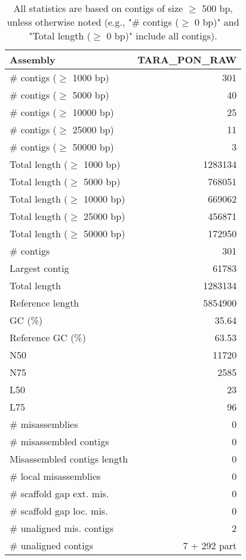 \documentclass[12pt,a4paper]{article}
\begin{document}
\begin{table}[ht]
\begin{center}
\caption{All statistics are based on contigs of size $\geq$ 500 bp, unless otherwise noted (e.g., "\# contigs ($\geq$ 0 bp)" and "Total length ($\geq$ 0 bp)" include all contigs).}
\begin{tabular}{|l*{1}{|r}|}
\hline
Assembly & TARA\_PON\_RAW \\ \hline
\# contigs ($\geq$ 1000 bp) & 301 \\ \hline
\# contigs ($\geq$ 5000 bp) & 40 \\ \hline
\# contigs ($\geq$ 10000 bp) & 25 \\ \hline
\# contigs ($\geq$ 25000 bp) & 11 \\ \hline
\# contigs ($\geq$ 50000 bp) & 3 \\ \hline
Total length ($\geq$ 1000 bp) & 1283134 \\ \hline
Total length ($\geq$ 5000 bp) & 768051 \\ \hline
Total length ($\geq$ 10000 bp) & 669062 \\ \hline
Total length ($\geq$ 25000 bp) & 456871 \\ \hline
Total length ($\geq$ 50000 bp) & 172950 \\ \hline
\# contigs & 301 \\ \hline
Largest contig & 61783 \\ \hline
Total length & 1283134 \\ \hline
Reference length & 5854900 \\ \hline
GC (\%) & 35.64 \\ \hline
Reference GC (\%) & 63.53 \\ \hline
N50 & 11720 \\ \hline
N75 & 2585 \\ \hline
L50 & 23 \\ \hline
L75 & 96 \\ \hline
\# misassemblies & 0 \\ \hline
\# misassembled contigs & 0 \\ \hline
Misassembled contigs length & 0 \\ \hline
\# local misassemblies & 0 \\ \hline
\# scaffold gap ext. mis. & 0 \\ \hline
\# scaffold gap loc. mis. & 0 \\ \hline
\# unaligned mis. contigs & 2 \\ \hline
\# unaligned contigs & 7 + 292 part \\ \hline

\end{tabular}
\end{center}
\end{table}
\end{document}
